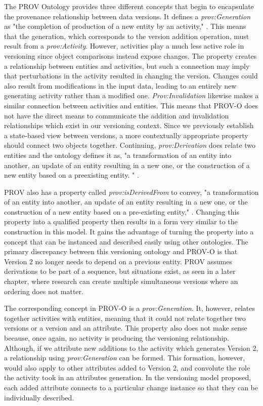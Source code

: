 The PROV Ontology provides three different concepts that begin to encapsulate the provenance relationship between data versions.
It defines a \textit{prov:Generation} as "the completion of production of a new entity by an activity," \cite{Lebo2013}.
This means that the generation, which corresponds to the version addition operation, must result from a \textit{prov:Activity}.
However, activities play a much less active role in versioning since object comparisons instead expose changes.
The property creates a relationship between entities and activities, but such a connection may imply that perturbations in the activity resulted in changing the version.
Changes could also result from modifications in the input data, leading to an entirely new generating activity rather than a modified one.
\textit{Prov:Invalidation} likewise makes a similar connection between activities and entities.
This means that PROV-O does not have the direct means to communicate the addition and invalidation relationships which exist in our versioning context.
Since we previously establish a state-based view between versions, a more contextually appropriate property should connect two objects together.
Continuing, \textit{prov:Derivation} does relate two entities and the ontology defines it as, "a transformation of an entity into another, an update of an entity resulting in a new one, or the construction of a new entity based on a preexisting entity. " \cite{Lebo2013}.

PROV also has a property called \textit{prov:isDerivedFrom} to convey, "a transformation of an entity into another, an update of an entity resulting in a new one, or the construction of a new entity based on a pre-existing entity," \cite{Lebo2013}.
Changing this property into a qualified property then results in a form very similar to the construction in this model.
It gains the advantage of turning the property into a concept that can be instanced and described easily using other ontologies.
The primary discrepancy between this versioning ontology and PROV-O is that Version 2 no longer needs to depend on a previous entity.
PROV assumes derivations to be part of a sequence, but situations exist, as seen in a later chapter, where research can create multiple simultaneous versions where an ordering does not matter.

The corresponding concept in PROV-O is a \textit{prov:Generation}.
It, however, relates together activities with entities, meaning that it could not relate together two versions or a version and an attribute.
This property also does not make sense because, once again, no activity is producing the versioning relationship.
Although, if we attribute new additions to the activity which generates Version 2, a relationship using \textit{prov:Generation} can be formed.
This formation, however, would also apply to other attributes added to Version 2, and convolute the role the activity took in an attributes generation.
In the versioning model proposed, each added attribute connects to a particular change instance so that they can be individually described.

